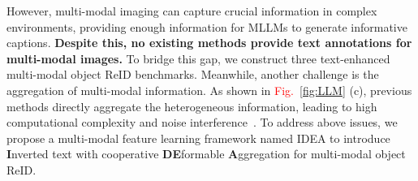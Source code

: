 %
However, multi-modal imaging can capture crucial information in complex environments, providing enough information for MLLMs to generate informative captions.
%
\textbf{Despite this, no existing methods provide text annotations for multi-modal images.} 
%
To bridge this gap, we construct three text-enhanced multi-modal object ReID benchmarks.
%
Meanwhile, another challenge is the aggregation of multi-modal information.
%
As shown in \textcolor{red}{Fig.}~\ref{fig:LLM} (c), previous methods directly aggregate the heterogeneous information, leading to high computational complexity and noise interference~\cite{zhang2024magic}.
%
To address above issues, we propose a multi-modal feature learning framework named IDEA to introduce \textbf{I}nverted text with cooperative \textbf{DE}formable \textbf{A}ggregation for multi-modal object ReID.
%

